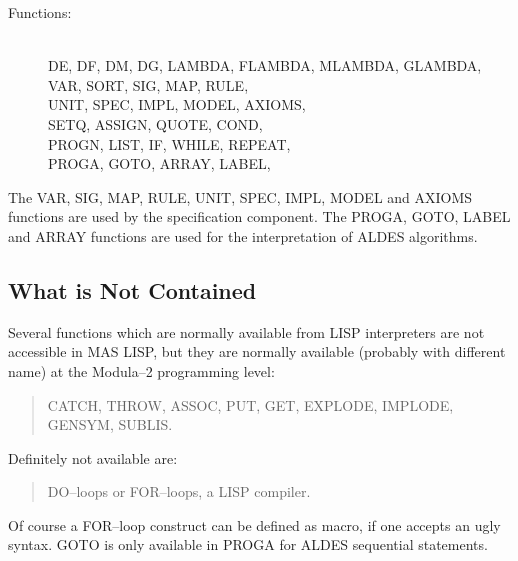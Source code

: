\begin{description}
\item[Functions:] \mbox{ }
     \\
     DE, DF, DM, DG, 
     LAMBDA, FLAMBDA, 
     MLAMBDA, GLAMBDA, 
     \\
     VAR, SORT, 
     SIG, MAP, RULE,
     \\
     UNIT, SPEC, IMPL, 
     MODEL, AXIOMS, 
     \\
     SETQ, ASSIGN, 
     QUOTE, COND, 
     \\
     PROGN, LIST, 
     IF, WHILE, REPEAT, 
     \\
     PROGA, GOTO,
     ARRAY, LABEL,
\end{description}

The VAR, SIG, MAP, RULE, UNIT, SPEC, IMPL, MODEL and AXIOMS
functions are used by the specification component.
The PROGA, GOTO, LABEL and ARRAY functions are used for the 
interpretation of ALDES algorithms.


\subsection{What is Not Contained}

Several functions which are normally available from 
LISP interpreters are not accessible in MAS LISP, but they are 
normally available (probably with different name) 
at the Modula--2 programming level:

\begin{quote}
CATCH, THROW, 
ASSOC, PUT, GET, 
EXPLODE, IMPLODE, 
GENSYM, SUBLIS.
\end{quote}

Definitely not available are:

\begin{quote}
DO--loops or FOR--loops, a LISP compiler. 
\end{quote}
Of course a FOR--loop construct can be defined as macro, 
if one accepts an ugly syntax.
GOTO is only available 
in PROGA for ALDES sequential statements.

